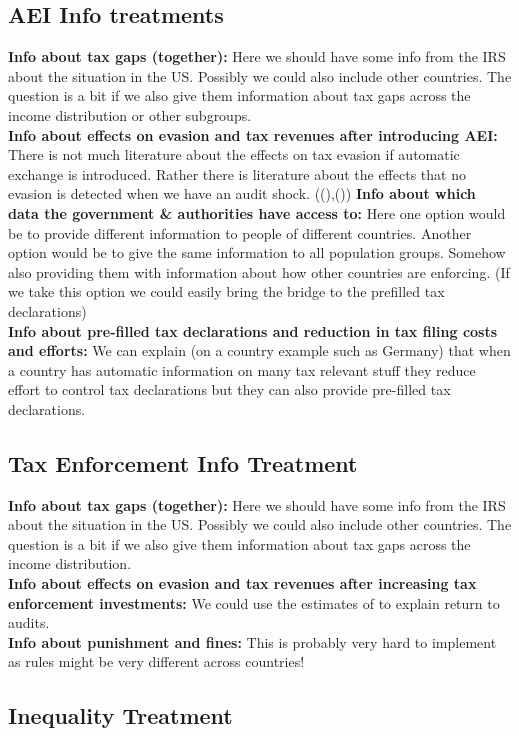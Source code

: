 \documentclass[12pt]{article}
\begin{document}
\subsection{AEI Info treatments}
\textbf{Info about tax gaps (together):} Here we should have some info from the IRS about the situation in the US. Possibly we could also include other countries. The question is a bit if we also give them information about tax gaps across the income distribution or other subgroups. \\
\textbf{Info about effects on evasion and tax revenues after introducing AEI:} There is not much literature about the effects on tax evasion if automatic exchange is introduced. Rather there is literature about the effects that no evasion is detected when we have an audit shock. ((\cite{kleven2011unwilling}),(\cite{pomeranz2015no}))    
\textbf{Info about which data the government \& authorities have access to:} Here one option would be to provide different information to people of different countries. Another option would be to give the same information to all population groups. Somehow also providing them with information about how other countries are enforcing. (If we take this option we could easily bring the bridge to the prefilled tax declarations)\\
\textbf{Info about pre-filled tax declarations and reduction in tax filing costs and efforts:} We can explain (on a country example such as Germany) that when a country has automatic information on many tax relevant stuff they reduce effort to control tax declarations but they can also provide pre-filled tax declarations. 
\subsection{Tax Enforcement Info Treatment}
\textbf{Info about tax gaps (together):} Here we should have some info from the IRS about the situation in the US. Possibly we could also include other countries. The question is a bit if we also give them information about tax gaps across the income distribution. \\
\textbf{Info about effects on evasion and tax revenues after increasing tax enforcement investments:} We could use the estimates of \cite{kleven2011unwilling} to explain return to audits. \\
\textbf{Info about punishment and fines:} This is probably very hard to implement as rules might be very different across countries!
\subsection{Inequality Treatment}
\end{document}
